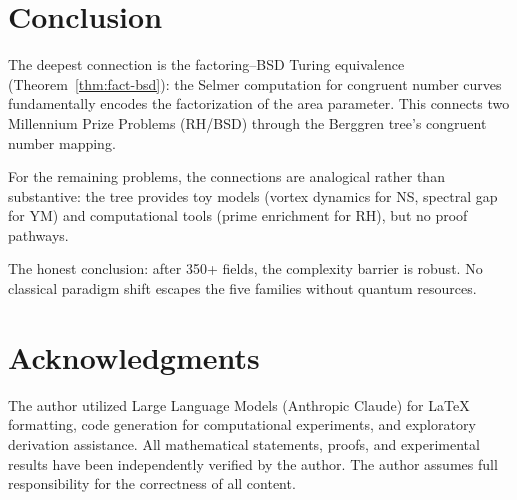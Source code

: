\documentclass[12pt]{amsart}
\theoremstyle{definition}
\theoremstyle{remark}
\begin{document}
\section{Conclusion}\label{sec:conclusion}

The deepest connection is the factoring--BSD Turing equivalence
(Theorem~\ref{thm:fact-bsd}): the Selmer computation for congruent number
curves fundamentally encodes the factorization of the area parameter.
This connects two Millennium Prize Problems (RH/BSD) through the Berggren
tree's congruent number mapping.

For the remaining problems, the connections are analogical rather than
substantive: the tree provides toy models (vortex dynamics for NS,
spectral gap for YM) and computational tools (prime enrichment for RH),
but no proof pathways.

The honest conclusion: after 350+ fields, the complexity barrier is
robust. No classical paradigm shift escapes the five families without
quantum resources.

\section*{Acknowledgments}
The author utilized Large Language Models (Anthropic Claude) for \LaTeX{}
formatting, code generation for computational experiments, and exploratory
derivation assistance. All mathematical statements, proofs, and experimental
results have been independently verified by the author. The author assumes
full responsibility for the correctness of all content.
\end{document}
